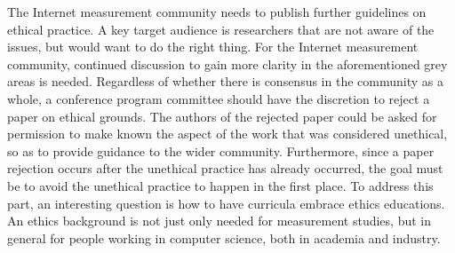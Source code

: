 
The Internet measurement community needs to publish further guidelines on
ethical practice. A key target audience is researchers that are not aware of
the issues, but would want to do the right thing. For the Internet measurement
community, continued discussion to gain more clarity in the aforementioned
grey areas is needed.  Regardless of whether there is consensus in the
community as a whole, a conference program committee should have the
discretion to reject a paper on ethical grounds. The authors of the rejected
paper could be asked for permission to make known the aspect of the work that
was considered unethical, so as to provide guidance to the wider community.
Furthermore, since a paper rejection occurs after the unethical practice has
already occurred, the goal must be to avoid the unethical practice to happen
in the first place. To address this part, an interesting question is how to
have curricula embrace ethics educations. An ethics background is not just
only needed for measurement studies, but in general for people working in
computer science, both in academia and industry.

